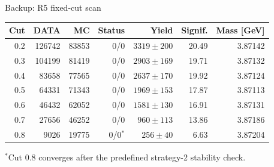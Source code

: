 \begin{frame}{Backup: R5 fixed-cut scan}
  \vspace{4pt}
  \begin{center}
    \small
    \begin{tabular}{rrrrrrr}
      \toprule
      Cut & DATA & MC & Status & Yield & Signif. & Mass [GeV] \\
      \midrule
      0.2 & 126742 & 83853 & 0/0 & $3319\pm200$ & 20.49 & 3.87142 \\
      0.3 & 104199 & 81419 & 0/0 & $2903\pm169$ & 19.71 & 3.87132 \\
      0.4 & 83658  & 77565 & 0/0 & $2637\pm170$ & 19.92 & 3.87124 \\
      0.5 & 64331  & 71343 & 0/0 & $1969\pm153$ & 17.87 & 3.87113 \\
      0.6 & 46432  & 62052 & 0/0 & $1581\pm130$ & 16.91 & 3.87131 \\
      0.7 & 27656  & 46252 & 0/0 & $960\pm113$  & 13.86 & 3.87186 \\
      0.8 & 9026   & 19775 & 0/0$^\ast$ & $256\pm40$ & 6.63 & 3.87204 \\
      \bottomrule
    \end{tabular}
  \end{center}
  \vspace{0.5em}
  \centering\small
  $^\ast$Cut 0.8 converges after the predefined strategy-2 stability check.
\end{frame}


